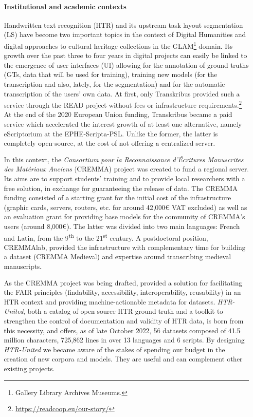 \documentclass{article}
\begin{document}
\paragraph{Institutional and academic contexts}

Handwritten text recognition (HTR) and its upstream task layout segmentation (LS) have become two important topics in the context of Digital Humanities and digital approaches to cultural heritage collections in the GLAM\footnote{Gallery Library Archives Museums.} domain. Its growth over the past three to four years in digital projects can easily be linked to the emergence of user interfaces (UI) allowing for the annotation of ground truths (GTs, data that will be used for training), training new models (for the transcription and also, lately, for the segmentation) and for the automatic transcription of the users' own data. At first, only Transkribus \citep{kahle2017transkribus} provided such a service through the READ project without fees or infrastructure requirements.\footnote{\url{https://readcoop.eu/our-story/}} At the end of the 2020 European Union funding, Transkribus became a paid service which accelerated the interest growth of at least one alternative, namely eScriptorium \citep{kiessling2019escriptorium} at the EPHE-Scripta-PSL. Unlike the former, the latter is completely open-source, at the cost of not offering a centralized server.

In this context, the \textit{Consortium pour la Reconnaissance d’Écritures Manuscrites des Matériaux Anciens} (CREMMA) project was created to fund a regional server. Its aims are to support students' training and to provide local researchers with a free solution, in exchange for guaranteeing the release of data. The CREMMA funding consisted of a starting grant for the initial cost of the infrastructure (graphic cards, servers, routers, etc. for around 42,000€ VAT excluded) as well as an evaluation grant for providing base models for the community of CREMMA's users (around 8,000€). The latter was divided into two main languages: French and Latin, from the 9\textsuperscript{th} to the 21\textsuperscript{st} century. A postdoctoral position, CREMMAlab, provided the infrastructure with complementary time for building a dataset (CREMMA Medieval) and expertise around transcribing medieval manuscripts.

As the CREMMA project was being drafted, \cite{Chague_HTR-United_Ground_Truth} provided a solution for facilitating the FAIR principles (findability, accessibility, interoperability, reusability) in an HTR context and providing machine-actionable metadata for datasets. \textit{HTR-United}, both a catalog of open source HTR ground truth and a toolkit to strengthen the control of documentation and validity of HTR data, is born from this necessity, and offers, as of late October 2022, 56 datasets composed of 41.5 million characters, 725,862 lines in over 13 languages and 6 scripts. By designing \textit{HTR-United} we became aware of the stakes of spending our budget in the creation of new corpora and models. They are useful and can complement other existing projects.
\end{document}
